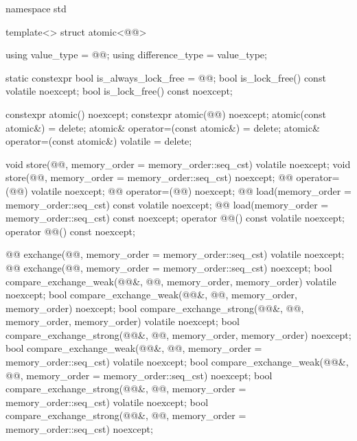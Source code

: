 \begin{codeblock}
namespace std {
  template<> struct atomic<@@> {
    using value_type = @@;
    using difference_type = value_type;

    static constexpr bool is_always_lock_free = @@;
    bool is_lock_free() const volatile noexcept;
    bool is_lock_free() const noexcept;

    constexpr atomic() noexcept;
    constexpr atomic(@@) noexcept;
    atomic(const atomic&) = delete;
    atomic& operator=(const atomic&) = delete;
    atomic& operator=(const atomic&) volatile = delete;

    void store(@@, memory_order = memory_order::seq_cst) volatile noexcept;
    void store(@@, memory_order = memory_order::seq_cst) noexcept;
    @@ operator=(@@) volatile noexcept;
    @@ operator=(@@) noexcept;
    @@ load(memory_order = memory_order::seq_cst) const volatile noexcept;
    @@ load(memory_order = memory_order::seq_cst) const noexcept;
    operator @@() const volatile noexcept;
    operator @@() const noexcept;

    @@ exchange(@@,
                           memory_order = memory_order::seq_cst) volatile noexcept;
    @@ exchange(@@,
                           memory_order = memory_order::seq_cst) noexcept;
    bool compare_exchange_weak(@@&, @@,
                               memory_order, memory_order) volatile noexcept;
    bool compare_exchange_weak(@@&, @@,
                               memory_order, memory_order) noexcept;
    bool compare_exchange_strong(@@&, @@,
                                 memory_order, memory_order) volatile noexcept;
    bool compare_exchange_strong(@@&, @@,
                                 memory_order, memory_order) noexcept;
    bool compare_exchange_weak(@@&, @@,
                               memory_order = memory_order::seq_cst) volatile noexcept;
    bool compare_exchange_weak(@@&, @@,
                               memory_order = memory_order::seq_cst) noexcept;
    bool compare_exchange_strong(@@&, @@,
                                 memory_order = memory_order::seq_cst) volatile noexcept;
    bool compare_exchange_strong(@@&, @@,
                                 memory_order = memory_order::seq_cst) noexcept;

}}
\end{codeblock}
